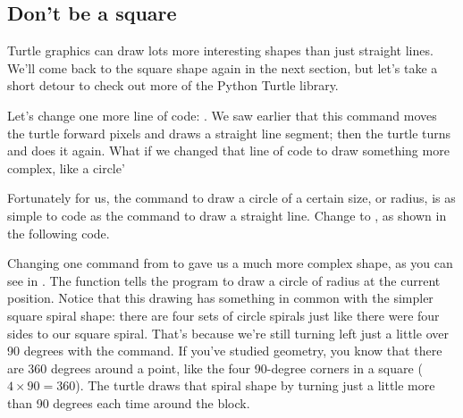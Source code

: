 \documentclass{coderdojo}
\begin{document}
\subsection{Don't be a square}

Turtle graphics can draw lots more interesting shapes than just straight lines. We'll come back to the square shape again in the next section, but let's take a short detour to check out more of the Python Turtle library.

Let's change one more line of code: . We saw earlier that this command moves the turtle forward  pixels and draws a straight line segment; then the turtle turns and does it again. What if we changed that line of code to draw something more complex, like a circle'

Fortunately for us, the command to draw a circle of a certain size, or radius, is as simple to code as the command to draw a straight line. Change  to , as shown in the following code.



Changing one command from  to  gave us a much more complex shape, as you can see in . The  function tells the program to draw a circle of radius  at the current position. Notice that this drawing has something in common with the simpler square spiral shape: there are four sets of circle spirals just like there were four sides to our square spiral. That's because we're still turning left just a little over 90 degrees with the  command. If you've studied geometry, you know that there are 360 degrees around a point, like the four 90-degree corners in a square (\(4 \times 90 = 360\)). The turtle draws that spiral shape by turning just a little more than 90 degrees each time around the block.
\end{document}
